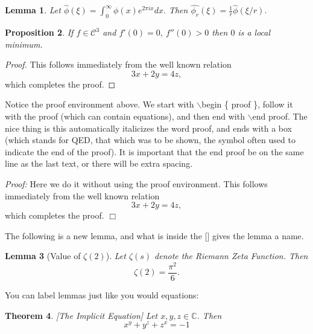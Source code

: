 \documentclass[12pt,reqno]{amsart}
\newtheorem{thm}{Theorem}[section]
\newtheorem{lem}[thm]{Lemma}
\newtheorem{prop}[thm]{Proposition}
\newcommand{\C}{\ensuremath{\mathbb{C}}}
\numberwithin{equation}{section}
\begin{document}
\begin{lem} Let $\hat{\phi} (\xi) = \int_0^\infty \phi(x) e^{2 \pi i x} dx.$ Then
$\hat{\phi_r} (\xi) = \frac{1}{r} \hat{\phi}(\xi / r). $
\end{lem}

\begin{prop}
If $f \in \mathcal{C}^3$ and $f'(0) = 0, \ f''(0) > 0$ then $0$ is
a local minimum.
\end{prop}

\begin{proof} This follows immediately from the well known relation
\begin{equation}
3x + 2y = 4z,
\end{equation} which completes the proof. \end{proof}

Notice the proof environment above. We start with
$\backslash$begin \{ proof \}, follow it with the proof (which can
contain equations), and then end with $\backslash$end proof. The
nice thing is this automatically italicizes the word proof, and
ends with a box (which stands for QED, that which was to be shown,
the symbol often used to indicate the end of the proof). It is
important that the end proof be on the same line as the last text,
or there will be extra spacing.

\bigskip


\noindent \emph{Proof:} Here we do it without using the proof environment. This follows immediately from the well known relation
\begin{equation}
3x + 2y = 4z,
\end{equation} which completes the proof. \hfill $\Box$

\bigskip

The following is a new lemma, and what is inside the [] gives the
lemma a name.

\begin{lem}[Value of $\zeta(2)$]
Let $\zeta(s)$ denote the Riemann Zeta Function. Then
\begin{equation}
\zeta(2) = \frac{\pi^2}{6}.
\end{equation}
\end{lem}

You can label lemmas just like you would equations:

\begin{thm}\label{thm:implicitequationn}[The Implicit Equation] Let
$x, y, z \in \C$. Then
\begin{equation}
x^y + y^z + z^x = -1
\end{equation}
\end{thm}
\end{document}
